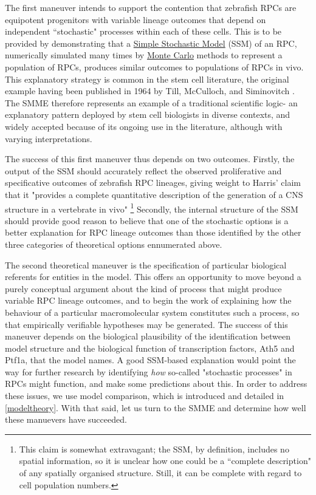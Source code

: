 The first maneuver intends to support the contention that zebrafish RPCs are equipotent progenitors with variable lineage outcomes that depend on independent ``stochastic" processes within each of these cells. This is to be provided by demonstrating that a \hyperref[SSM]{Simple Stochastic Model} (SSM) of an RPC, numerically simulated many times by \hyperref[MonteCarlo]{Monte Carlo} methods to represent a population of RPCs, produces similar outcomes to populations of RPCs in vivo. This explanatory strategy is common in the stem cell literature, the original example having been published in 1964 by Till, McCulloch, and Siminovitch \cite{Till1964}. The SMME therefore represents an example of a traditional scientific logic- an explanatory pattern deployed by stem cell biologists in diverse contexts, and widely accepted because of its ongoing use in the literature, although with varying interpretations.

The success of this first maneuver thus depends on two outcomes. Firstly, the output of the SSM should accurately reflect the observed proliferative and specificative outcomes of zebrafish RPC lineages, giving weight to Harris' claim that it "provides a complete quantitative description of the generation of a CNS structure in a vertebrate in vivo" \cite{He2012}\footnote{This claim is somewhat extravagant; the SSM, by definition, includes no spatial information, so it is unclear how one could be a ``complete description" of any spatially organised structure. Still, it can be complete with regard to cell population numbers.} Secondly, the internal structure of the SSM should provide good reason to believe that one of the stochastic options is a better explanation for RPC lineage outcomes than those identified by the other three categories of theoretical options ennumerated above.

The second theoretical maneuver is the specification of particular biological referents for entities in the model. This offers an opportunity to move beyond a purely conceptual argument about the kind of process that might produce variable RPC lineage outcomes, and to begin the work of explaining how the behaviour of a particular macromolecular system constitutes such a process, so that empirically verifiable hypotheses may be generated. The success of this maneuver depends on the biological plausibility of the identification between model structure and the biological function of transcription factors, Ath5 and Ptf1a, that the model names. A good SSM-based explanation would point the way for further research by identifying \textit{how} so-called "stochastic processes" in RPCs might function, and make some predictions about this. In order to address these issues, we use model comparison, which is introduced and detailed in \autoref{modeltheory}. With that said, let us turn to the SMME and determine how well these manuevers have succeeded.